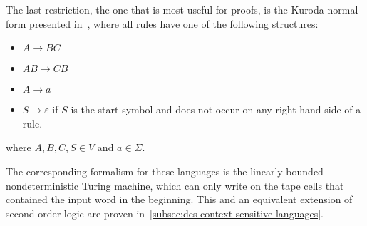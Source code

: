 The last restriction, the one that is most useful for proofs, is the Kuroda normal form presented in~\cite{Pettorossi2022}, where all rules have one of the following structures:
\begin{itemize}
    \setlength\itemsep{0.15em}
    \item $A \to BC$
    \item $AB \to CB$
    \item $A \to a$
    \item $S \to \varepsilon$ if $S$ is the start symbol and does not occur on any right-hand side of a rule.
\end{itemize}
where $A, B, C, S \in V$ and $a \in \Sigma$.

The corresponding formalism for these languages is the linearly bounded nondeterministic Turing machine, which can only write on the tape cells that contained the input word in the beginning.
This and an equivalent extension of second-order logic are proven in~\cref{subsec:des-context-sensitive-languages}.
